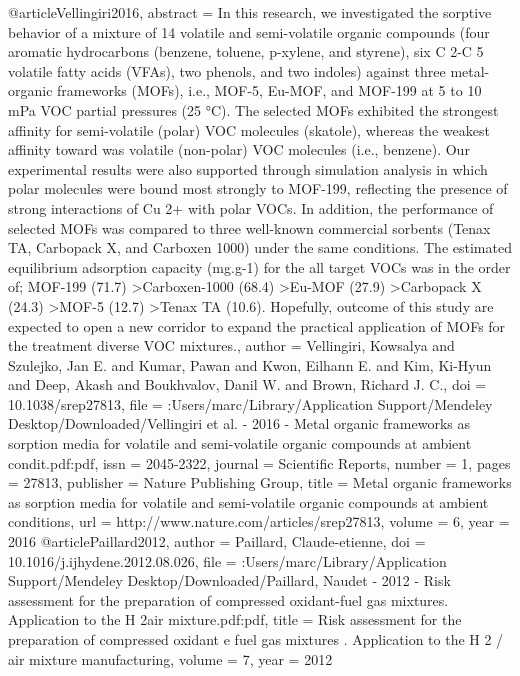 @article{Vellingiri2016,
abstract = {In this research, we investigated the sorptive behavior of a mixture of 14 volatile and semi-volatile organic compounds (four aromatic hydrocarbons (benzene, toluene, p-xylene, and styrene), six C 2-C 5 volatile fatty acids (VFAs), two phenols, and two indoles) against three metal-organic frameworks (MOFs), i.e., MOF-5, Eu-MOF, and MOF-199 at 5 to 10 mPa VOC partial pressures (25 °C). The selected MOFs exhibited the strongest affinity for semi-volatile (polar) VOC molecules (skatole), whereas the weakest affinity toward was volatile (non-polar) VOC molecules (i.e., benzene). Our experimental results were also supported through simulation analysis in which polar molecules were bound most strongly to MOF-199, reflecting the presence of strong interactions of Cu 2+ with polar VOCs. In addition, the performance of selected MOFs was compared to three well-known commercial sorbents (Tenax TA, Carbopack X, and Carboxen 1000) under the same conditions. The estimated equilibrium adsorption capacity (mg.g-1) for the all target VOCs was in the order of; MOF-199 (71.7) {\textgreater}Carboxen-1000 (68.4) {\textgreater}Eu-MOF (27.9) {\textgreater}Carbopack X (24.3) {\textgreater}MOF-5 (12.7) {\textgreater}Tenax TA (10.6). Hopefully, outcome of this study are expected to open a new corridor to expand the practical application of MOFs for the treatment diverse VOC mixtures.},
author = {Vellingiri, Kowsalya and Szulejko, Jan E. and Kumar, Pawan and Kwon, Eilhann E. and Kim, Ki-Hyun and Deep, Akash and Boukhvalov, Danil W. and Brown, Richard J. C.},
doi = {10.1038/srep27813},
file = {:Users/marc/Library/Application Support/Mendeley Desktop/Downloaded/Vellingiri et al. - 2016 - Metal organic frameworks as sorption media for volatile and semi-volatile organic compounds at ambient condit.pdf:pdf},
issn = {2045-2322},
journal = {Scientific Reports},
number = {1},
pages = {27813},
publisher = {Nature Publishing Group},
title = {{Metal organic frameworks as sorption media for volatile and semi-volatile organic compounds at ambient conditions}},
url = {http://www.nature.com/articles/srep27813},
volume = {6},
year = {2016}
}
@article{Paillard2012,
author = {Paillard, Claude-etienne},
doi = {10.1016/j.ijhydene.2012.08.026},
file = {:Users/marc/Library/Application Support/Mendeley Desktop/Downloaded/Paillard, Naudet - 2012 - Risk assessment for the preparation of compressed oxidant-fuel gas mixtures. Application to the H 2air mixture.pdf:pdf},
title = {{Risk assessment for the preparation of compressed oxidant e fuel gas mixtures . Application to the H 2 / air mixture manufacturing}},
volume = {7},
year = {2012}
}
